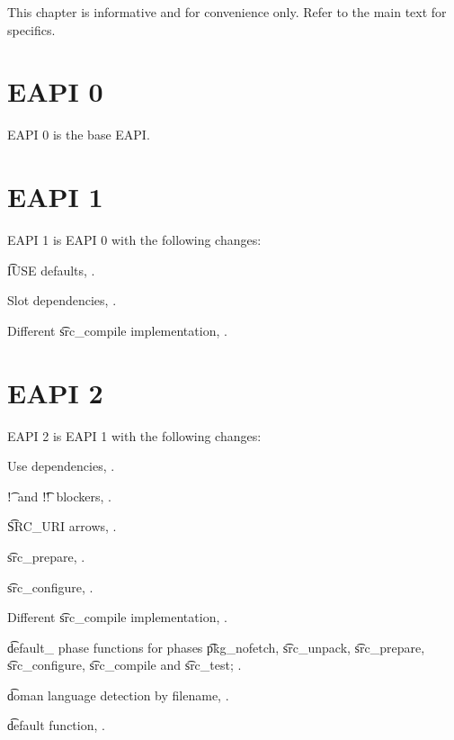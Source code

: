 \note This chapter is informative and for convenience only. Refer to the main text for specifics.

\section*{EAPI 0}

EAPI 0 is the base EAPI.

\section*{EAPI 1}

EAPI 1 is EAPI 0 with the following changes:

\begin{compactitem}
\item \t{IUSE} defaults, .
\item Slot dependencies, .
\item Different \t{src\_compile} implementation, .
\end{compactitem}

\section*{EAPI 2}

EAPI 2 is EAPI 1 with the following changes:

\begin{compactitem}
\item Use dependencies, .
\item \t{!}\ and \t{!!}\ blockers, .
\item \t{SRC\_URI} arrows, .
\item \t{src\_prepare}, .
\item \t{src\_configure}, .
\item Different \t{src\_compile} implementation, .
\item \t{default\_} phase functions for phases \t{pkg\_nofetch}, \t{src\_unpack}, \t{src\_prepare},
    \t{src\_configure}, \t{src\_compile} and \t{src\_test}; .
\item \t{doman} language detection by filename, .
\item \t{default} function, .
\end{compactitem}

